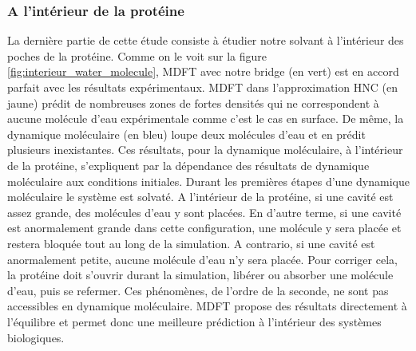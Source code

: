 \subsubsection{A l'intérieur de la protéine}
La dernière partie de cette étude consiste à étudier notre solvant à l'intérieur des poches de la protéine. Comme on le voit sur la figure \ref{fig:interieur_water_molecule}, MDFT avec notre bridge (en vert) est en accord parfait avec les résultats expérimentaux. MDFT dans l'approximation HNC (en jaune) prédit de nombreuses zones de fortes densités qui ne correspondent à aucune molécule d'eau expérimentale comme c'est le cas en surface. De même, la dynamique moléculaire (en bleu) loupe deux molécules d'eau et en prédit plusieurs inexistantes. Ces résultats, pour la dynamique moléculaire, à l'intérieur de la protéine, s'expliquent par la dépendance des résultats de dynamique moléculaire aux conditions initiales. Durant les premières étapes d'une dynamique moléculaire le système est solvaté. A l'intérieur de la protéine, si une cavité est assez grande, des molécules d'eau y sont placées. En d'autre terme, si une cavité est anormalement grande dans cette configuration, une molécule y sera placée et restera bloquée tout au long de la simulation. A contrario, si une cavité est anormalement petite, aucune molécule d'eau n'y sera placée. Pour corriger cela, la protéine doit s'ouvrir durant la simulation, libérer ou absorber une molécule d'eau, puis se refermer. Ces phénomènes, de l'ordre de la seconde, ne sont pas accessibles en dynamique moléculaire. MDFT propose des résultats directement à l'équilibre et permet donc une meilleure prédiction à l'intérieur des systèmes biologiques.




